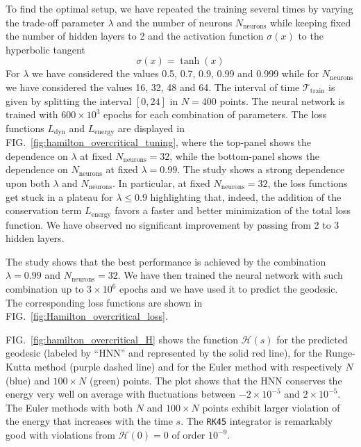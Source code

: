\documentclass[prd,aps,a4paper,eqsecnum,nofootinbib,floatfix,twocolumn,superscriptaddress]{revtex4-2}
\renewcommand{\quote}[1]{``#1''}
\begin{document}
To find the optimal setup, we have repeated the training several times by varying the trade-off parameter $\lambda$ and the number  of neurons $N_\mathrm{neurons}$  while keeping fixed the number of hidden layers to 2 and the activation function $\sigma(x)$ to the hyperbolic tangent
\begin{equation}\label{eq:act_fun}
    \sigma(x) = \tanh(x)
\end{equation}
For $\lambda $ we have considered the values 0.5, 0.7, 0.9, 0.99 and 0.999 while for $N_\mathrm{neurons}$  we have considered the values 16, 32, 48 and 64. 
The interval of time $\mathcal{T}_\mathrm{train}$ is given by splitting the interval $[0,24]$ in $N=400$ points. The neural network is trained with $600\times 10^3$ epochs for each combination of parameters. The loss functions $L_\mathrm{dyn}$ and $L_\mathrm{energy}$ are displayed in FIG.~\ref{fig:hamilton_overcritical_tuning}, where the top-panel shows the dependence on $\lambda$ at fixed $N_\mathrm{neurons}=32$, while the bottom-panel shows the dependence on $N_\mathrm{neurons}$ at fixed $\lambda=0.99$. The study shows a strong dependence upon both $\lambda$ and $N_\mathrm{neurons}$. In particular, at fixed $N_\mathrm{neurons}=32$, the loss functions get stuck in a plateau for $\lambda\le 0.9$ highlighting that, indeed, the addition of the conservation term $L_\mathrm{energy}$ favors a faster and better minimization of the total loss function. We have observed no significant improvement by passing from 2 to 3 hidden layers. 

The study shows that the best performance is achieved by the combination $\lambda=0.99$ and $N_\mathrm{neurons}=32$. We have then trained the neural network with such combination up to $3\times 10^6$ epochs and we have used it to predict the geodesic. The corresponding loss functions are shown in FIG.~\ref{fig:Hamilton_overcritical_loss}.

FIG.~\ref{fig:hamilton_overcritical_H} shows the function $\mathcal{H}(s)$ for the predicted geodesic (labeled by \quote{HNN} and represented by the solid red line), for the Runge-Kutta method (purple dashed line) and for the Euler method with respectively $N$ (blue) and $100\times N$ (green) points. The plot shows that the HNN conserves the energy very well on average with fluctuations between $-2\times 10^{-5}$ and $2\times 10^{-5}$. The Euler methods with both $N$ and $100\times N$ points exhibit larger violation of the energy that increases with the time $s$. The \texttt{RK45} integrator is remarkably good with violations from $\mathcal{H}(0)=0$ of order $10^{-9}$.
\end{document}
